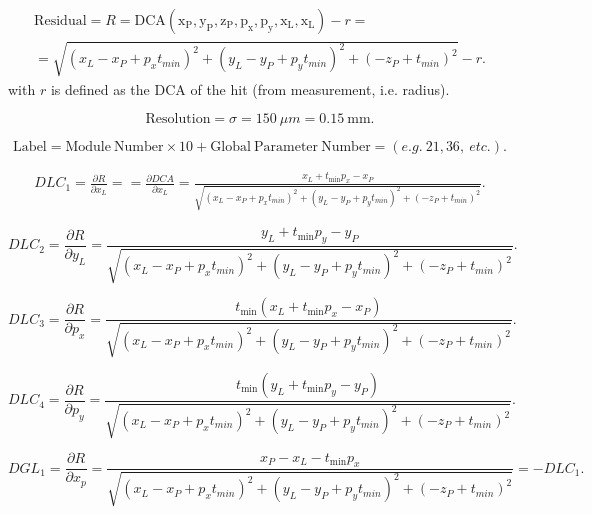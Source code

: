 \documentclass[a4paper,11pt]{article}
\begin{document}
\begin{equation}
\begin{split}
\mathrm{Residual} = R = \mathrm{DCA(x_P, y_P, z_P, p_x, p_y, x_L, x_L)} -r = \\
=\sqrt{ (x_L - x_P + p_xt_{min})^2 + (y_L - y_P + p_yt_{min})^2  + (-z_P + t_{min})^2} -r.
\end{split}
\end{equation}
with $r$ is defined as the DCA of the hit (from measurement, i.e.  radius). 

\begin{equation}	
\mathrm{Resolution} = \sigma = 150 \ \mu m = 0.15 \ \mathrm{mm}.
\end{equation}

\begin{equation}	
\mathrm{Label}= \mathrm{Module \ Number} \times 10 + \mathrm{Global \ Parameter \ Number} = (e.g. \ 21, 36, \ etc.).
\end{equation}

\begin{equation}
\begin{split}
DLC_1 = \frac{\partial R}{\partial x_L}==\frac{\partial DCA}{\partial x_L} = \frac{ x_L+t_{\min } p_x-x_P }{\sqrt{(x_L - x_P + p_xt_{min})^2 + (y_L - y_P + p_yt_{min})^2  + (-z_P + t_{min})^2 }}.
\end{split}
\end{equation}

\begin{equation}
DLC_2 = \frac{ \partial R}{\partial y_L} = \frac{y_L+t_{\min } p_y-y_P}{\sqrt{(x_L - x_P + p_xt_{min})^2 + (y_L - y_P + p_yt_{min})^2  + (-z_P + t_{min})^2 }}.
\end{equation}

\begin{equation}
DLC_3 = \frac{ \partial R}{\partial p_x}  = \frac{ t_{\min } \left(x_L+t_{\min } p_x-x_P\right)}{\sqrt{(x_L - x_P + p_xt_{min})^2 + (y_L - y_P + p_yt_{min})^2  + (-z_P + t_{min})^2 }}.
\end{equation}

\begin{equation}
DLC_4 = \frac{ \partial R}{\partial p_y} = \frac{t_{\min } \left(y_L+t_{\min } p_y-y_P\right) }{\sqrt{(x_L - x_P + p_xt_{min})^2 + (y_L - y_P + p_yt_{min})^2  + (-z_P + t_{min})^2 }}.
\end{equation}


\begin{equation}	
DGL_1 = \frac{\partial R}{\partial x_p} = \frac{x_P-x_L-t_{\min } p_x }{\sqrt{(x_L - x_P + p_xt_{min})^2 + (y_L - y_P + p_yt_{min})^2  + (-z_P + t_{min})^2 }} = - DLC_1.
\end{equation}
\end{document}
